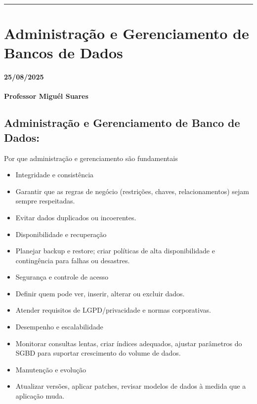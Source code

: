 \documentclass[
]{book}
\begin{document}
\begin{center}\rule{0.5\linewidth}{0.5pt}\end{center}

\chapter{Administração e Gerenciamento de Bancos de Dados}\label{administrauxe7uxe3o-e-gerenciamento-de-bancos-de-dados}

\subsubsection*{25/08/2025}\label{section-3}

\subsubsection*{Professor Miguél Suares}\label{professor-miguuxe9l-suares-3}

\section{Administração e Gerenciamento de Banco de Dados:}\label{administrauxe7uxe3o-e-gerenciamento-de-banco-de-dados}

Por que administração e gerenciamento são fundamentais

\begin{itemize}
\item
  Integridade e consistência
\item
  Garantir que as regras de negócio (restrições, chaves, relacionamentos) sejam sempre respeitadas.
\item
  Evitar dados duplicados ou incoerentes.
\item
  Disponibilidade e recuperação
\item
  Planejar backup e restore; criar políticas de alta disponibilidade e contingência para falhas ou desastres.
\item
  Segurança e controle de acesso
\item
  Definir quem pode ver, inserir, alterar ou excluir dados.
\item
  Atender requisitos de LGPD/privacidade e normas corporativas.
\item
  Desempenho e escalabilidade
\item
  Monitorar consultas lentas, criar índices adequados, ajustar parâmetros do SGBD para suportar crescimento do volume de dados.
\item
  Manutenção e evolução
\item
  Atualizar versões, aplicar patches, revisar modelos de dados à medida que a aplicação muda.
\end{itemize}
\end{document}
